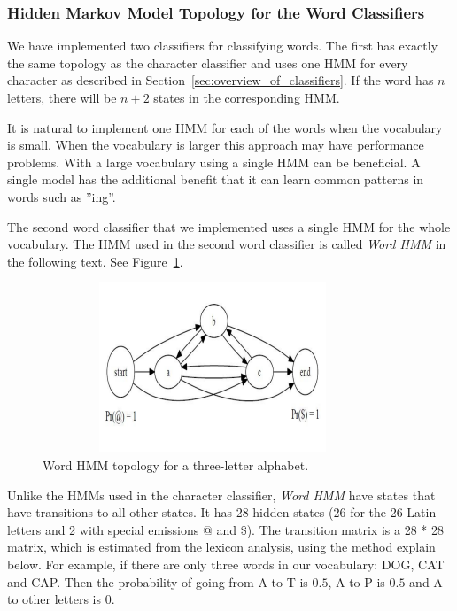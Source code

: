 \subsubsection{Hidden Markov Model Topology for the Word Classifiers}

We have implemented two classifiers for classifying words. 
The first has exactly the same topology as the character classifier and uses one HMM for every character as described in Section~\ref{sec:overview_of_classifiers}. 
If the word has $n$ letters, there will be $n + 2$ states in the corresponding HMM.

It is natural to implement one HMM for each of the words when the vocabulary is small.
When the vocabulary is larger this approach may have performance problems.
With a large vocabulary using a single HMM can be beneficial.
A single model has the additional benefit that it can learn common patterns in words such as ''ing''.

The second word classifier that we implemented uses a single HMM for the whole vocabulary. 
The HMM used in the second word classifier is called \textit{Word HMM} in the following text.
See Figure~\ref{figure:wordtopology}.

\begin{figure}[h!]
\centering
\includegraphics[width=4in,height=2in]{wordtopology}
\caption{Word HMM topology for a three-letter alphabet.}
\label{figure:wordtopology}
\end{figure}

Unlike the HMMs used in the character classifier, \textit{Word HMM} have states that have transitions to all other states.
It has 28 hidden states (26 for the 26 Latin letters and 2 with special emissions @ and \$). 
The transition matrix is a 28 * 28 matrix, which is estimated from the lexicon analysis, using the method explain below.
For example, if there are only three words in our vocabulary: DOG, CAT and CAP.
Then the probability of going from A to T is $0.5$, A to P is $0.5$ and A to other letters is $0$.

